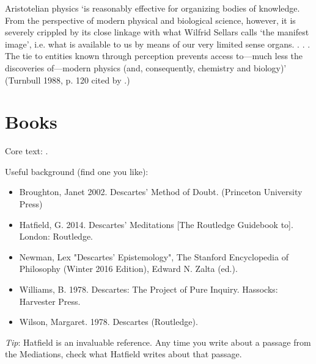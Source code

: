 \documentclass[12pt]{extarticle}
\begin{document}
\begin{multicols*}{3}
Aristotelian physics ‘is reasonably effective for organizing bodies of knowledge. From the 
perspective of modern physical and biological science, however, it is severely crippled by 
its close linkage with what Wilfrid Sellars calls ‘the manifest image’, i.e. what is available 
to us by means of our very limited sense organs. . . . The tie to entities known through 
perception prevents access to—much less the discoveries of—modern physics (and, consequently, 
chemistry and biology)’
(Turnbull 1988, p. 120 cited by \citealp{bennett:2003_learning}.)
 
\section{Books}
Core text: \citep{descartes:1985_csm2}.

Useful background (find one you like):
\begin{itemize}
\item Broughton, Janet 2002. Descartes' Method of Doubt. (Princeton University Press)
\item Hatfield, G. 2014. Descartes’ Meditations [The Routledge Guidebook to]. London: Routledge. 
\item Newman, Lex "Descartes' Epistemology", The Stanford Encyclopedia of Philosophy (Winter 2016 Edition), Edward N. Zalta (ed.).
\item Williams, B. 1978. Descartes: The Project of Pure Inquiry. Hassocks: Harvester Press. 
\item Wilson, Margaret. 1978. Descartes (Routledge).
\end{itemize}
\emph{Tip}: Hatfield is an invaluable reference. Any time you write about a 
passage from the Mediations, check what Hatfield writes about that passage.


    
    







\footnotesize


\end{multicols*}
\end{document}
